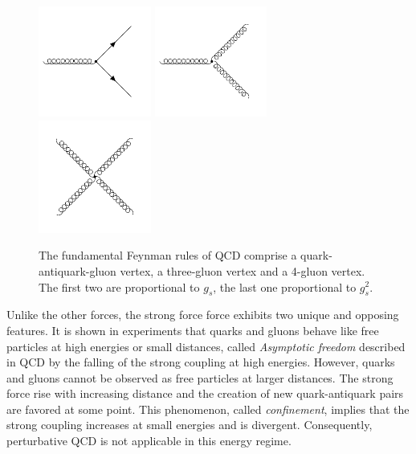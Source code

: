 \begin{figure}[htb] 
    \centering
    \includegraphics[width=0.33\textwidth]{figures/drawings/feynman/gqq.pdf}\hfill
    \includegraphics[width=0.33\textwidth]{figures/drawings/feynman/ggg.pdf}\hfill
    \includegraphics[width=0.33\textwidth]{figures/drawings/feynman/gggg.pdf}\hfill
    \caption[Fundamental vertices of QCD]{The fundamental Feynman rules of QCD
    comprise a quark-antiquark-gluon vertex, a three-gluon vertex and a 4-gluon
    vertex. The first two are proportional to $g_{s}$, the last one
    proportional to $g_{s}^2$.} 
    \label{fig:fundamental_couplings} 
\end{figure}

Unlike the other forces, the strong force force exhibits two unique and opposing
features. It is shown in experiments that quarks and gluons behave like free
particles at high energies or small distances, called \emph{Asymptotic freedom}
described in QCD by the falling of the strong coupling at high energies.
However, quarks and gluons cannot be observed as free particles at larger
distances. The strong force rise with increasing distance and the creation of
new quark-antiquark pairs are favored at some point. This phenomenon, called
\emph{confinement}, implies that the strong coupling increases at small energies
and is divergent. Consequently, perturbative QCD is not applicable in this
energy regime.

